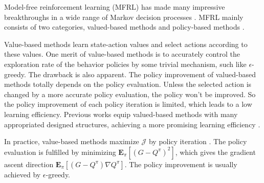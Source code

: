 

Model-free reinforcement learning (MFRL) has made many impressive breakthroughs in a wide range of Markov decision processes  \citep[MDP]{alpha_star,ftw,agent57}.
MFRL mainly consists of two categories, valued-based methods \citep{dqn,rainbow} and policy-based methods \citep{trpo,ppo,impala}.

Value-based methods learn state-action values and select actions according to these values. 
One merit of value-based methods is to accurately control the exploration rate of the behavior policies by some trivial mechanism, such like $\epsilon$-greedy.
The drawback is also apparent. 
The policy improvement of valued-based methods totally depends on the policy evaluation. 
Unless the selected action is changed by a more accurate policy evaluation, the policy won't be improved. 
So the policy improvement of each policy iteration is limited, which leads to a low learning efficiency.
Previous works equip valued-based methods with many appropriated designed structures, achieving a more promising learning efficiency \citep{dueling_q,priority_q,r2d2}.


In practice, value-based methods maximize $\mathcal{J}$ by policy iteration \citep{sutton}. 
The policy evaluation is fulfilled by minimizing $\textbf{E}_{\pi} [(G - Q^\pi) ^ 2]$, which gives the gradient ascent direction 
$\textbf{E}_{\pi} [(G - Q^\pi) \nabla Q^\pi]$. 
The policy improvement is usually achieved by $\epsilon$-greedy.

